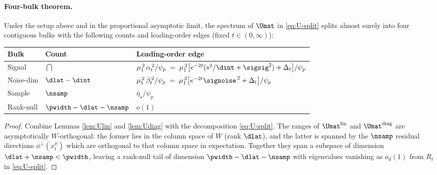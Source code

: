 \paragraph{Four-bulk theorem.}
\begin{theorem}
\label{thm:fourbulk}
Under the setup above and in the proportional asymptotic limit, the
spectrum of $\Umat$ in \eqref{eq:U-split} splits almost surely into
four contiguous bulks with the following counts and leading-order
edges (fixed $t \in (0,\infty)$):
\begin{center}
\begin{tabular}{@{}lll@{}}
\toprule
Bulk & Count & Leading-order edge \\
\midrule
Signal      & $\dint$                  & $\mu_1^{\,2}\,\alpha_t^{\,2}/\psi_p
                                          \;=\; \mu_1^{\,2}\bigl[e^{-2t}(s^2/\dint+\sigsig^2)+\Delta_t\bigr]/\psi_p$ \\
Noise-dim   & $\dlat-\dint$            & $\mu_1^{\,2}\,\beta_t^{\,2}/\psi_p
                                          \;=\; \mu_1^{\,2}\bigl[e^{-2t}\signoise^{\,2}+\Delta_t\bigr]/\psi_p$ \\
Sample      & $\nsamp$                 & $\bar\eta_\star/\psi_p$ \\
Rank-null   & $\pwidth-\dlat-\nsamp$   & $o(1)$ \\
\bottomrule
\end{tabular}
\end{center}
\end{theorem}
\begin{proof}
Combine Lemmas \ref{lem:Ulin} and \ref{lem:Udiag} with the
decomposition \eqref{eq:U-split}. The ranges of $\Umat^{\mathrm{lin}}$
and $\Umat^{\mathrm{diag}}$ are asymptotically $W$-orthogonal: the
former lies in the column space of $W$ (rank $\dlat$), and the latter
is spanned by the $\nsamp$ residual directions $\phi^\perp(x_t^\mu)$
which are orthogonal to that column space in expectation. Together
they span a subspace of dimension $\dlat + \nsamp < \pwidth$, leaving
a rank-null tail of dimension $\pwidth - \dlat - \nsamp$ with
eigenvalues vanishing as $o_d(1)$ from $R_t$ in \eqref{eq:U-split}.
\end{proof}

